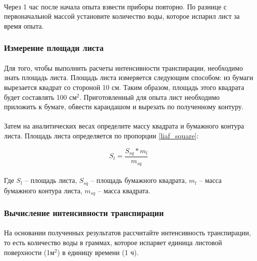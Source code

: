 \paragraph*{}Через 1 час после начала опыта взвести приборы повторно. По разнице с первоначальной массой установите количество воды, которое испарил лист за время опыта.

\subsubsection*{Измерение площади листа}

\paragraph*{}Для того, чтобы выполнить расчеты интенсивности транспирации, необходимо знать площадь листа. Площадь листа измеряется следующим способом: из бумаги вырезается квадрат со стороной 10 см. Таким образом, площадь этого квадрата будет составлять 100 см$^2$. Приготовленный для опыта лист необходимо приложить к бумаге, обвести карандашом и вырезать по полученному контуру. 

\paragraph*{}Затем на аналитических весах определите массу квадрата и бумажного контура листа. Площадь листа определяется по пропорции \ref{liaf_square}: 

\begin{equation}
  \label{liaf_square}
  S_l = \frac{S_{sq} * m_l}
                 {m_{sq}}
\end{equation}

\paragraph*{}Где $S_{l}$ – площадь листа, $S_{sq}$ – площадь бумажного квадрата, $m_l$ – масса бумажного контура листа, $m_{sq}$ – масса квадрата.

\subsubsection*{Вычисление интенсивности транспирации}

\paragraph*{}На основании полученных результатов рассчитайте интенсивность транспирации, то есть количество воды в граммах, которое испаряет единица листовой поверхности (1м$^2$) в единицу времени (1 ч).

